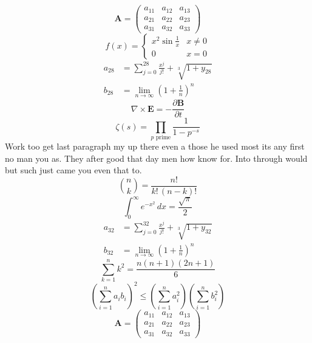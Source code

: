 \documentclass[11pt]{article}
\begin{document}
\begin{equation}
\mathbf{A} = \begin{pmatrix} a_{11} & a_{12} & a_{13} \\ a_{21} & a_{22} & a_{23} \\ a_{31} & a_{32} & a_{33} \end{pmatrix}
\end{equation}
\begin{equation}
f(x) = \begin{cases} x^2 \sin\frac{1}{x} & x \ne 0 \\ 0 & x = 0 \end{cases}
\end{equation}
\begin{align}
  a_{28} &= \sum_{j=0}^{28} \frac{x^j}{j!} + \sqrt[3]{1+y_{28}} \\
  b_{28} &= \lim_{n\to\infty} \left(1+\frac{1}{n}\right)^{n}
\end{align}
\begin{equation}
\nabla \times \mathbf{E} = -\frac{\partial \mathbf{B}}{\partial t}
\end{equation}
\begin{equation}
\zeta(s) = \prod_{p \text{ prime}} \frac{1}{1 - p^{-s}}
\end{equation}
Work too get last paragraph my up there even a those he used most its any first no man you as. They after good that day men how know for. Into through would but such just came you even that to.
\begin{equation}
\binom{n}{k} = \frac{n!}{k!\,(n-k)!}
\end{equation}
\begin{equation}
\int_0^\infty e^{-x^2}\,dx = \frac{\sqrt{\pi}}{2}
\end{equation}
\begin{align}
  a_{32} &= \sum_{j=0}^{32} \frac{x^j}{j!} + \sqrt[3]{1+y_{32}} \\
  b_{32} &= \lim_{n\to\infty} \left(1+\frac{1}{n}\right)^{n}
\end{align}
\begin{equation}
\sum_{k=1}^{n} k^2 = \frac{n(n+1)(2n+1)}{6}
\end{equation}
\begin{equation}
\left( \sum_{i=1}^n a_i b_i \right)^2 \le \left(\sum_{i=1}^n a_i^2\right)\left(\sum_{i=1}^n b_i^2\right)
\end{equation}
\begin{equation}
\mathbf{A} = \begin{pmatrix} a_{11} & a_{12} & a_{13} \\ a_{21} & a_{22} & a_{23} \\ a_{31} & a_{32} & a_{33} \end{pmatrix}
\end{equation}
\end{document}
